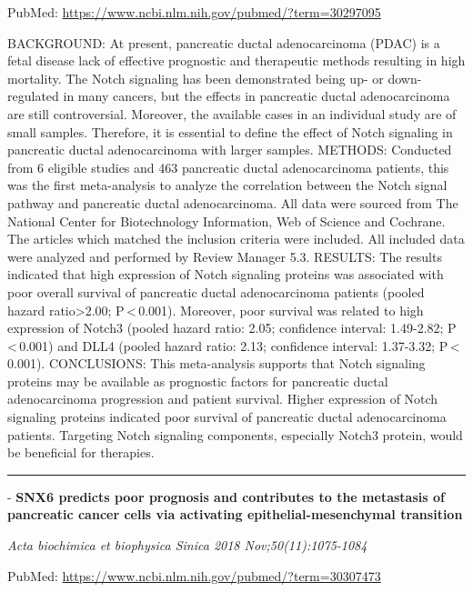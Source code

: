 \documentclass[]{article}
\begin{document}
PubMed: \url{https://www.ncbi.nlm.nih.gov/pubmed/?term=30297095}

BACKGROUND: At present, pancreatic ductal adenocarcinoma (PDAC) is a
fetal disease lack of effective prognostic and therapeutic methods
resulting in high mortality. The Notch signaling has been demonstrated
being up- or down-regulated in many cancers, but the effects in
pancreatic ductal adenocarcinoma are still controversial. Moreover, the
available cases in an individual study are of small samples. Therefore,
it is essential to define the effect of Notch signaling in pancreatic
ductal adenocarcinoma with larger samples. METHODS: Conducted from 6
eligible studies and 463 pancreatic ductal adenocarcinoma patients, this
was the first meta-analysis to analyze the correlation between the Notch
signal pathway and pancreatic ductal adenocarcinoma. All data were
sourced from The National Center for Biotechnology Information, Web of
Science and Cochrane. The articles which matched the inclusion criteria
were included. All included data were analyzed and performed by Review
Manager 5.3. RESULTS: The results indicated that high expression of
Notch signaling proteins was associated with poor overall survival of
pancreatic ductal adenocarcinoma patients (pooled hazard
ratio\textgreater{}2.00; P\,\textless{}\,0.001). Moreover, poor survival
was related to high expression of Notch3 (pooled hazard ratio: 2.05;
confidence interval: 1.49-2.82; P\,\textless{}\,0.001) and DLL4 (pooled
hazard ratio: 2.13; confidence interval: 1.37-3.32;
P\,\textless{}\,0.001). CONCLUSIONS: This meta-analysis supports that
Notch signaling proteins may be available as prognostic factors for
pancreatic ductal adenocarcinoma progression and patient survival.
Higher expression of Notch signaling proteins indicated poor survival of
pancreatic ductal adenocarcinoma patients. Targeting Notch signaling
components, especially Notch3 protein, would be beneficial for
therapies.

{}

{}

\begin{center}\rule{0.5\linewidth}{\linethickness}\end{center}

 - \textbf{SNX6 predicts poor prognosis and contributes to the
metastasis of pancreatic cancer cells via activating
epithelial-mesenchymal transition}

\emph{Acta biochimica et biophysica Sinica 2018 Nov;50(11):1075-1084}

PubMed: \url{https://www.ncbi.nlm.nih.gov/pubmed/?term=30307473}
\end{document}
